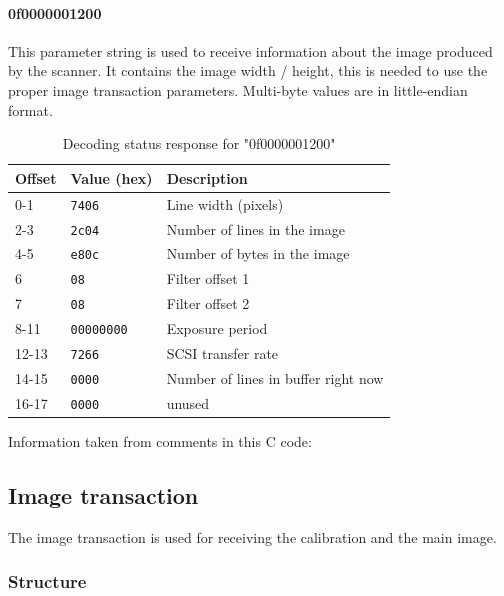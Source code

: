 \documentclass{article}
\begin{document}
\paragraph{0f0000001200}

This parameter string is used to receive information about the image produced by the scanner.
It contains the image width / height, this is needed to use the proper image transaction
parameters. Multi-byte values are in little-endian format.

\begin{table}[H]
  \caption{Decoding status response for "0f0000001200"}
  \centering
  \begin{tabular}{p{1cm} | p{2cm} | p{7cm}}
    Offset & Value (hex) & Description \\ \hline
    0-1 & {\tt 7406} & Line width (pixels) \\
    2-3 & {\tt 2c04} & Number of lines in the image \\
    4-5 & {\tt e80c} & Number of bytes in the image \\
    6 & {\tt 08} & Filter offset 1 \\
    7 & {\tt 08} & Filter offset 2 \\
    8-11 & {\tt 00000000} & Exposure period \\
    12-13 & {\tt 7266} & SCSI transfer rate \\
    14-15 & {\tt 0000} & Number of lines in buffer right now \\
    16-17 & {\tt 0000} & unused \\
  \end{tabular}
  
  \vspace{5mm}
  Information taken from comments in this C code: \cite[\texttt{pieusb\_scancmd.c}]{sane_code}
  \label{table:imageparam_query}
\end{table}

\subsection{Image transaction}

The image transaction is used for receiving the calibration and the main image.

\subsubsection{Structure}
\end{document}
